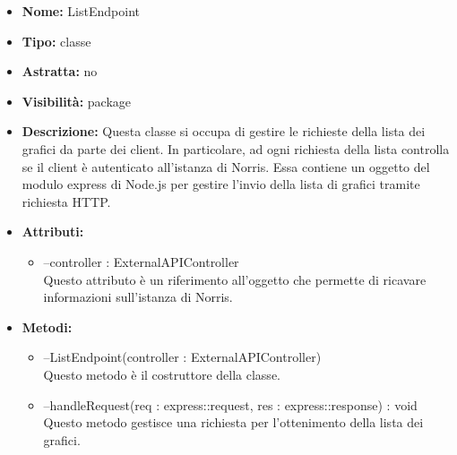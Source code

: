 	
			
			\begin{itemize}
			\item \textbf{Nome:} ListEndpoint
			\item \textbf{Tipo:} classe
			
		\item \textbf{Astratta:}
		no
			\item \textbf{Visibilità:} package
			\item \textbf{Descrizione:} Questa classe si occupa di gestire le richieste della lista dei  grafici da parte dei client. In particolare, ad ogni richiesta della lista controlla se il client è autenticato all'istanza di Norris. Essa contiene un oggetto del modulo express di Node.js per gestire l'invio della lista di grafici tramite richiesta HTTP.
			\item \textbf{Attributi:}
				\begin{itemize}
				\setlength{\itemsep}{5pt}
				
					\item[\ding{111}] {--controller : ExternalAPIController} \\ [1mm] Questo attributo è un riferimento all'oggetto che permette di ricavare informazioni sull'istanza di Norris.
				\end{itemize}
		
			\item \textbf{Metodi:}
				\begin{itemize}
				\setlength{\itemsep}{5pt}
				
					\item[\ding{111}] {{--ListEndpoint(controller : ExternalAPIController)}} \\ [1mm] Questo metodo è il costruttore della classe.
					\item[\ding{111}] {{--handleRequest(req : express::request, res : express::response) : void}} \\ [1mm] Questo metodo gestisce una richiesta per l'ottenimento della lista dei grafici.
				\end{itemize}
		
			\end{itemize}

